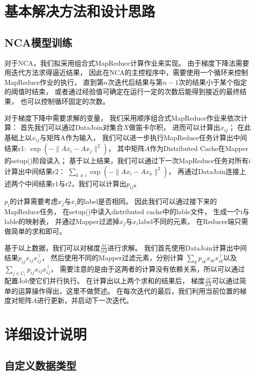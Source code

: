 \documentclass[a4paper,UTF8]{article}
\theoremstyle{definition}
\begin{document}
\section*{基本解决方法和设计思路}

\subsection*{NCA模型训练}

对于NCA，我们拟采用组合式MapReduce计算作业来实现。
由于梯度下降法需要用迭代方法求得逼近结果，
因此在NCA的主控程序中，需要使用一个循环来控制MapReduce作业的执行，
直到第$n$次迭代后结果与第$n-1$次的结果小于某个指定的阈值时结束，
或者通过经验值可确定在运行一定的次数后能得到接近的最终结果，
也可以控制循环固定的次数。

对于梯度下降中需要求解的变量，
我们采用顺序组合式MapReduce作业来依次计算：
首先我们可以通过DataJoin对集合$X$做笛卡尔积，
进而可以计算出$x_{ij}$；
在此基础上以$x_{ij}$与矩阵A作为输入，
我们可以进一步执行MapReduce任务计算出中间结果r1:
$\exp(-\lVert Ax_{i} - Ax_{j} \rVert^2)$，
其中矩阵$A$作为Distributed Cache在Mapper的setup()阶段读入；
基于以上结果，我们可以通过下一次MapReduce任务对所有$i$计算出中间结果r2：
$\sum_{k \neq i} \exp(-\lVert Ax_{i} - Ax_{k} \rVert^2)$，
再通过DataJoin连接上述两个中间结果r1与r2，我们可以计算出$p_{ij}$。

$p_i$的计算需要考虑$x_j$与$x_i$的label是否相同。
因此我们可以通过接下来的MapReduce任务，
在setup()中读入distributed cache中的lable文件，
生成一个i与lable的映射表，
并通过Mapper过滤掉$x_j$与$x_i$label不同的元素，
在Reducer端只需做简单的求和即可。

基于以上数据，我们可以对梯度$\frac{\partial f}{\partial A}$进行求解。
我们首先使用DataJoin计算出中间结果$p_{ij} x_{ij} x_{ij}^\top$，
然后使用不同的Mapper过滤元素，分别计算
$\sum_{k} p_{ik} x_{ik} x_{ik}^\top$以及$\sum_{j \in C_i} p_{ij} x_{ij} x_{ij}^\top$，
需要注意的是由于这两者的计算没有依赖关系，所以可以通过配置Job使它们并行执行。
在计算出以上两个求和的结果后，
梯度$\frac{\partial f}{\partial A}$可以通过简单的运算操作得出，这里不做赘述。
在每次迭代的最后，我们利用当前位置的梯度对矩阵$A$进行更新，并启动下一次迭代。

\section*{详细设计说明}

\subsection*{自定义数据类型}
\end{document}
